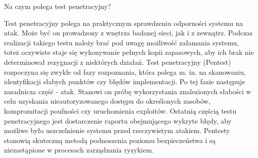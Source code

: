 \documentclass[answers,11pt]{exam}
\begin{document}
\begin{questions}
\question Na czym polega test penetracyjny?
\begin{solution}
Test penetracyjny polega na praktycznym sprawdzeniu odporności systemu na atak. Może być on prowadzony z wnętrza badanej sieci, jak i z zewnątrz. Podczas realizacji takiego testu należy brać pod uwagę możliwość załamania systemu, toteż oczywiste staje się wykonywanie pełnych kopii zapasowych, aby ich brak nie determinował rezygnacji z niektórych działań. Test penetracyjny (Pentest) rozpoczyna się zwykle od fazy rozpoznania, która polega m. in. na skanowaniu, identyfikacji słabych punktów czy błędów implementacji. Po tej fazie następuje zasadnicza część - atak. Stanowi on próbę wykorzystania znalezionych słabości w celu uzyskania nieautoryzowanego dostępu do określonych zasobów, kompromitacji poufności czy uruchomienia exploitów. Ostatnią częścią testu penetracyjnego jest dostarczenie raportu obejmującego wykryte błędy, aby możliwe było uszczelnienie systemu przed rzeczywistym atakiem. Pentesty stanowią skuteczną metodą podnoszenia poziomu bezpieczeństwa i są niezastąpione w procesach zarządzania ryzykiem. 
\end{solution}

\end{questions}
\end{document}
